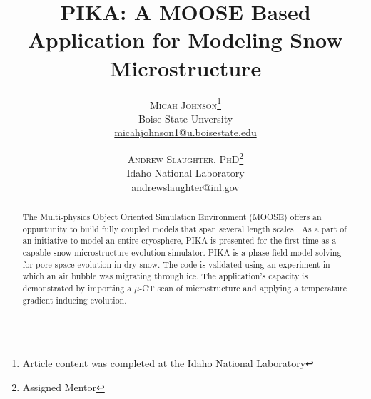 \documentclass[twoside]{article}
\title{\vspace{-15mm}\fontsize{24pt}{10pt}\selectfont\textbf{PIKA: A MOOSE Based Application for Modeling Snow Microstructure}} %
\author{
\large
\textsc{Micah Johnson}\thanks{Article content was completed at the Idaho National Laboratory}\\[2mm] %
\normalsize  Boise State Unversity \\ %
\normalsize \href{mailto:micahjohnson1@u.boisestate.edu}{micahjohnson1@u.boisestate.edu} %
\vspace{-5mm}
\and
\large
\textsc{Andrew Slaughter, PhD}\thanks{Assigned Mentor}\\[2mm] %
\normalsize  Idaho National Laboratory \\ %
\normalsize \href{mailto:andrewslaughter@inl.gov}{andrewslaughter@inl.gov} %
\vspace{-5mm}
}
\date{}
\begin{document}
\maketitle %

\thispagestyle{fancy} %


\begin{abstract}
The Multi-physics Object Oriented Simulation Environment (MOOSE) offers an oppurtunity to build fully coupled models that span several length scales \cite{Gaston_2009}. As a part of an initiative to  model an entire cryosphere, PIKA is presented for the first time as a capable snow microstructure evolution simulator. PIKA is a phase-field model solving for pore space evolution in dry snow. The code is validated using an experiment in which an air bubble was migrating through ice. The application's capacity is demonstrated by importing a $\mu$-CT scan of microstructure and applying a temperature gradient inducing evolution. 

\end{abstract}

\end{document}
